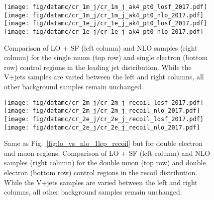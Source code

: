 \begin{figure}[htbp]
    \begin{center}
        \texttt{[image: fig/datamc/cr\_1m\_j/cr\_1m\_j\_ak4\_pt0\_losf\_2017.pdf]}
        \texttt{[image: fig/datamc/cr\_1m\_j/cr\_1m\_j\_ak4\_pt0\_nlo\_2017.pdf]} \\
        \texttt{[image: fig/datamc/cr\_1e\_j/cr\_1e\_j\_ak4\_pt0\_losf\_2017.pdf]}
        \texttt{[image: fig/datamc/cr\_1e\_j/cr\_1e\_j\_ak4\_pt0\_nlo\_2017.pdf]} \\
    \end{center}
    \caption{Comparison of LO + SF (left column) and NLO samples (right column) for the single muon (top row) and single electron (bottom row) control regions in the leading jet \pt distribution. While the V+jets samples are varied between the left and right columns, all other background samples remain unchanged.}
    \label{fig:lo_vs_nlo_1lep_ak4_pt0}
\end{figure}


\begin{figure}[htbp]
    \begin{center}
        \texttt{[image: fig/datamc/cr\_2m\_j/cr\_2m\_j\_recoil\_losf\_2017.pdf]}
        \texttt{[image: fig/datamc/cr\_2m\_j/cr\_2m\_j\_recoil\_nlo\_2017.pdf]} \\
        \texttt{[image: fig/datamc/cr\_2e\_j/cr\_2e\_j\_recoil\_losf\_2017.pdf]}
        \texttt{[image: fig/datamc/cr\_2e\_j/cr\_2e\_j\_recoil\_nlo\_2017.pdf]} \\
    \end{center}
    \caption{Same as Fig.~\ref{fig:lo_vs_nlo_1lep_recoil} but for double electron and muon regions. Comparison of LO + SF (left column) and NLO samples (right column) for the double muon (top row) and double electron (bottom row) control regions in the recoil distribution. While the V+jets samples are varied between the left and right columns, all other background samples remain unchanged.}
    \label{fig:lo_vs_nlo_2lep_recoil}
\end{figure}


